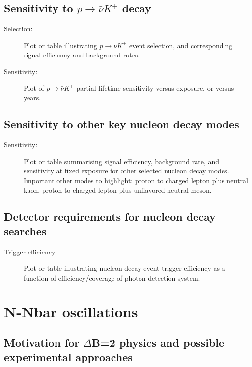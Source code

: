 \subsection{Sensitivity to $p\to\bar{\nu}K^+$ decay}
\label{subsec:nonaccel-ndk-nubarkplus}

\begin{description}
\item[Selection:] Plot or table illustrating $p\to\bar{\nu}K^+$ event selection, and corresponding signal efficiency and background rates.
\item[Sensitivity:] Plot of $p\to\bar{\nu}K^+$ partial lifetime sensitivity versus exposure, or versus years.
\end{description}

\subsection{Sensitivity to other key nucleon decay modes}
\label{subsec:nonaccel-ndk-other}

\begin{description}
\item[Sensitivity:] Plot or table summarising signal efficiency, background rate, and sensitivity at fixed exposure for other selected nucleon decay modes. Important other modes to highlight: proton to charged lepton plus neutral kaon, proton to charged lepton plus unflavored neutral meson.
\end{description}


\subsection{Detector requirements for nucleon decay searches}
\label{subsec:nonaccel-ndk-requirements}

\begin{description}
\item[Trigger efficiency:] Plot or table illustrating nucleon decay event trigger efficiency as a function of efficiency/coverage of photon detection system.
\end{description}


\section{N-Nbar oscillations}
\label{sec:nonaccel-nnbar}

\subsection{Motivation for $\Delta$B=2 physics and possible experimental approaches}
\label{subsec:nonaccel-nnbar-intro}

